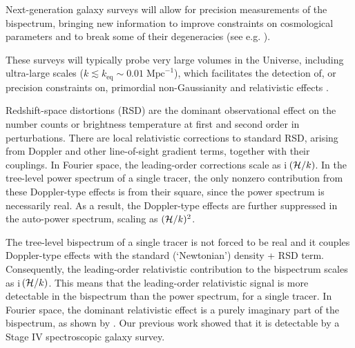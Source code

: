 {Next-generation galaxy surveys will allow for precision measurements of the  bispectrum, bringing new information to improve constraints on cosmological parameters and to break some of their degeneracies (see e.g. \cite{Scoccimarro:2015bla,Tellarini:2016sgp, Gil-Marin:2016wya,  Slepian:2016kfz,Gagrani:2016rfy, Sugiyama:2018yzo,Desjacques:2018pfv,Child:2018klv, Yankelevich:2018uaz, Schmit:2018rtf,DiDio:2018unb,Gualdi:2019ybt,Sarkar:2019ojl,Chudaykin:2019ock,Oddo:2019run, Sugiyama:2019ike,Philcox:2019hdi,Durrer:2020orn,Montanari:2020uez}). 

These surveys will typically probe very large volumes in the Universe, including ultra-large scales ($k\lesssim k_{\mathrm{eq}} \sim 0.01\;\mathrm{Mpc}^{-1}$), which facilitates the detection of, or precision constraints on, primordial non-Gaussianity \cite{Tellarini:2015faa,Watkinson:2017zbs,Majumdar:2017tdm,Karagiannis:2018jdt,Karagiannis:2019jjx,Bharadwaj:2020wkc}
and relativistic effects
\cite{Kehagias:2015tda,Umeh:2016nuh, DiDio:2016gpd, Jolicoeur:2017nyt,Bertacca:2017dzm,Jolicoeur:2017eyi,Koyama:2018ttg,Clarkson:2018dwn,Maartens:2019yhx,Jeong:2019igb}.
 
Redshift-space distortions (RSD) are the dominant observational effect on the number counts or brightness temperature at first and second order in perturbations. There are local relativistic corrections to standard RSD, arising from Doppler and other line-of-sight gradient terms, together with their couplings.  In Fourier space, the leading-order corrections  scale as i\,$(\mathcal{H}/k)$. In the tree-level power spectrum of a single tracer, the only nonzero contribution from these Doppler-type effects is from their square, since the power spectrum is necessarily real. As a result, the Doppler-type effects are further suppressed in the auto-power spectrum, scaling as  $(\mathcal{H}/k)^2$. 

The tree-level bispectrum of a single tracer is not forced to be real and it couples Doppler-type effects with the standard (`Newtonian') density + RSD term. Consequently, the leading-order relativistic contribution to the bispectrum scales as i\,$(\mathcal{H}/k)$. 
This means that the leading-order relativistic signal is more detectable in the bispectrum than the power spectrum, for a single tracer.
In Fourier space, the dominant relativistic effect is a purely imaginary part of the bispectrum, as shown by \cite{Clarkson:2018dwn,Maartens:2019yhx}. Our previous work \cite{Maartens:2019yhx} showed that it is detectable by a Stage IV spectroscopic galaxy survey.

}
